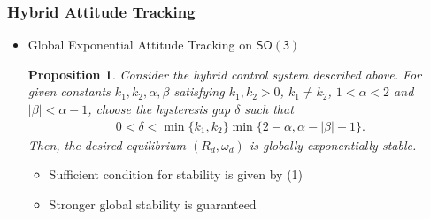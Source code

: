 \documentclass[11pt,professionalfonts,hyperref={pdftex,pdfpagemode=none,pdfstartview=FitH}]{beamer}
\newcommand{\SO}{\ensuremath{\mathsf{SO(3)}}}
\newtheorem{prop}{Proposition}
\renewcommand{\emph}[1]{\textit{\textbf{\color{blue}{#1}}}}
\begin{document}
\begin{frame}
\frametitle{Hybrid Attitude Tracking}

\begin{itemize}
\item Global Exponential Attitude Tracking on $\SO$

\begin{prop}\label{prop:GES}
Consider the hybrid control system described above. For given constants $k_1,k_2,\alpha,\beta$ satisfying $k_1,k_2>0$, $k_1\neq k_2$, $1<\alpha<2$ and $|\beta|< \alpha-1$, choose the hysteresis gap $\delta$ such that
\begin{align}
0<\delta < \min\{k_1,k_2\}\min\{2-\alpha, \alpha-|\beta|-1\}.\label{eqn:deltaSO}
\end{align}
Then, the desired equilibrium $(R_d,\omega_d)$ is globally exponentially stable.
\end{prop} 

\begin{itemize}
\item Sufficient condition for stability is \emph{explicitly} given by (1)
\item Stronger global \emph{exponential} stability is guaranteed
\end{itemize}
\end{itemize}
\end{frame}
\end{document}
